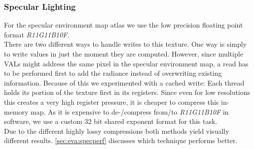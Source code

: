 \documentclass[thesis.tex]{subfiles}
\begin{document}
\subsubsection{Specular Lighting} \label{sec:impl:details:specular}
For the specular environment map atlas we use the low precision floating point format \emph{R11G11B10F}.
\\
There are two different ways to handle writes to this texture.
One way is simply to write values in just the moment they are computed.
However, since multiple VALs might address the same pixel in the specular environment map, a read has to be performed first to add the radiance instead of overwriting existing information.
Because of this we experimented with a cached write:
Each thread holds its portion of the texture first in its registers.
Since even for low resolutions this creates a very high register pressure, it is cheaper to compress this in-memory map.
As it is expensive to de-/compress from/to \emph{R11G11B10F} in software, we use a custom 32 bit shared exponent format for this task.
\\
Due to the different highly lossy compressions both methods yield visually different results.
\autoref{sec:eva:specperf} discusses which technique performs better.


\subfilebib %
\end{document}
